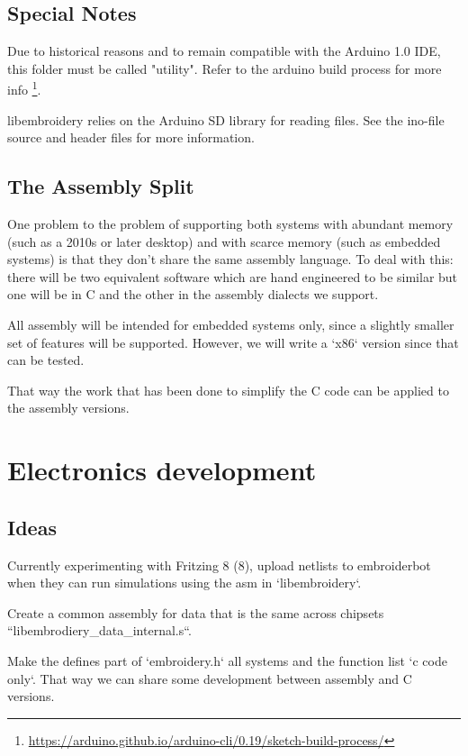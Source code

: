 \documentclass[a4paper]{report}
\begin{document}
\section{Special Notes}

Due to historical reasons and to remain compatible with the Arduino 1.0
IDE, this folder must be called "utility". Refer to the arduino build
process for more info
\footnote{\url{https://arduino.github.io/arduino-cli/0.19/sketch-build-process/}}.

libembroidery relies on the Arduino SD library for reading files. See
the ino-file source and header files for more information.

\section{The Assembly Split}

One problem to the problem of supporting both systems with abundant memory
(such as a 2010s or later desktop) and with scarce memory (such as embedded
systems) is that they don't share the same assembly language. To deal with
this: there will be two equivalent software which are hand engineered to be
similar but one will be in C and the other in the assembly dialects we support.

All assembly will be intended for embedded systems only, since a slightly
smaller set of features will be supported. However, we will write a
`x86` version since that can be tested.

That way the work that has been done to simplify the C code can be applied
to the assembly versions.

\chapter{Electronics development}

\section{Ideas}

Currently experimenting with Fritzing 8 (8), upload netlists to embroiderbot when
they can run simulations using the asm in `libembroidery`.

Create a common assembly for data that is the same across chipsets
``libembrodiery\_data\_internal.s``.

Make the defines part of `embroidery.h` all systems and the function list
`c code only`. That way we can share some development between assembly and C versions.
\end{document}
